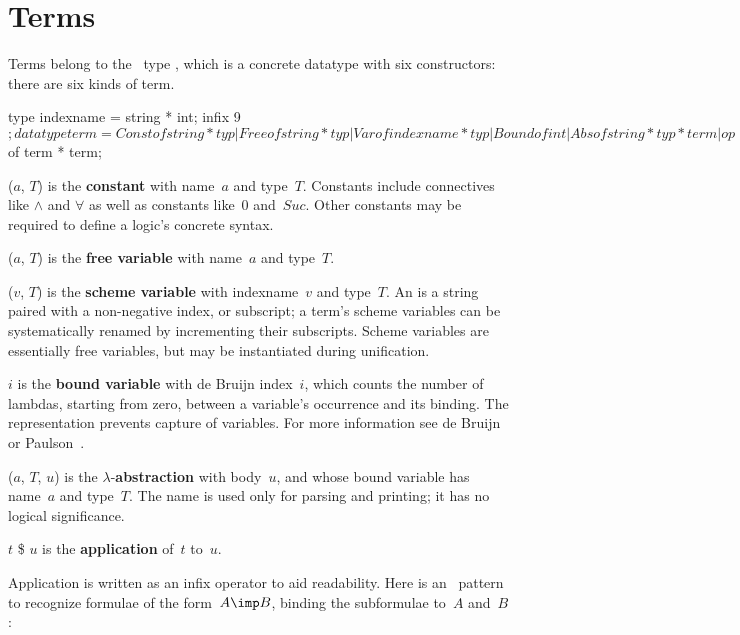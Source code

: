 \section{Terms}
Terms belong to the \ML\ type , which is a concrete datatype
with six constructors: there are six kinds of term.
\begin{ttbox}
type indexname = string * int;
infix 9 $;
datatype term = Const of string * typ
              | Free  of string * typ
              | Var   of indexname * typ
              | Bound of int
              | Abs   of string * typ * term
              | op $  of term * term;
\end{ttbox}
\begin{ttdescription}
\item[\ttindexbold{Const}($a$, $T$)] 
  is the {\bf constant} with name~$a$ and type~$T$.  Constants include
  connectives like $\land$ and $\forall$ as well as constants like~0
  and~$Suc$.  Other constants may be required to define a logic's concrete
  syntax.

\item[\ttindexbold{Free}($a$, $T$)] 
  is the {\bf free variable} with name~$a$ and type~$T$.

\item[\ttindexbold{Var}($v$, $T$)] 
  is the {\bf scheme variable} with indexname~$v$ and type~$T$.  An
   is a string paired with a non-negative index, or
  subscript; a term's scheme variables can be systematically renamed by
  incrementing their subscripts.  Scheme variables are essentially free
  variables, but may be instantiated during unification.

\item[\ttindexbold{Bound} $i$] 
  is the {\bf bound variable} with de Bruijn index~$i$, which counts the
  number of lambdas, starting from zero, between a variable's occurrence
  and its binding.  The representation prevents capture of variables.  For
  more information see de Bruijn \cite{debruijn72} or
  Paulson~\cite[page~336]{paulson91}.

\item[\ttindexbold{Abs}($a$, $T$, $u$)]
  is the $\lambda$-{\bf abstraction} with body~$u$, and whose bound
  variable has name~$a$ and type~$T$.  The name is used only for parsing
  and printing; it has no logical significance.

\item[$t$ \$ $u$]  
is the {\bf application} of~$t$ to~$u$.
\end{ttdescription}
Application is written as an infix operator to aid readability.
Here is an \ML\ pattern to recognize \FOL{} formulae of
the form~$A\imp B$, binding the subformulae to~$A$ and~$B$:


